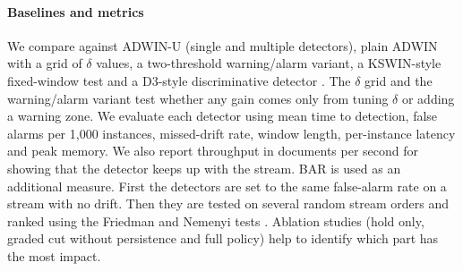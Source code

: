 \documentclass[conference]{IEEEtran}
\begin{document}
\paragraph{Baselines and metrics}
We compare against ADWIN-U (single and multiple detectors), plain ADWIN with a grid of $\delta$ values, a two-threshold warning/alarm variant, a KSWIN-style fixed-window test \cite{raab2020} and a D3-style discriminative detector \cite{gozuacik2019}. The $\delta$ grid and the warning/alarm variant test whether any gain comes only from tuning $\delta$ or adding a warning zone. We evaluate each detector using mean time to detection, false alarms per 1,000 instances, missed-drift rate, window length, per-instance latency and peak memory. We also report throughput in documents per second for showing that the detector keeps up with the stream. BAR \cite{assis2025} is used as an additional measure. First the detectors are set to the same false-alarm rate on a stream with no drift. Then they are tested on several random stream orders and ranked using the Friedman and Nemenyi tests \cite{demsar2006}. Ablation studies (hold only, graded cut without persistence and full policy) help to identify which part has the most impact.
\end{document}
